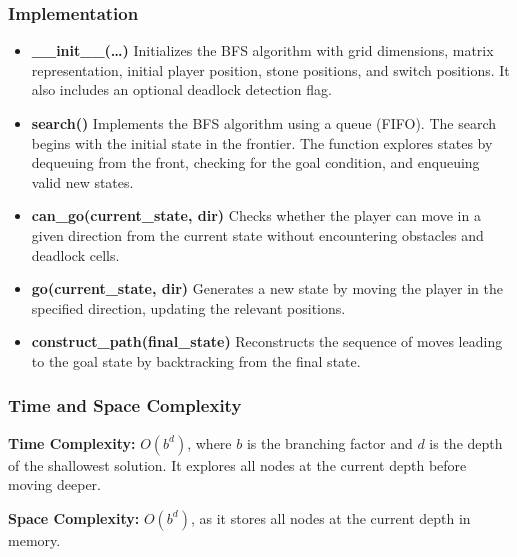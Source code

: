 \subsubsection{Implementation}
\begin{itemize}
	\item \textbf{\_\_init\_\_(\ldots)}
	      Initializes the BFS algorithm with grid dimensions, matrix representation, initial player position, stone positions, and switch positions. It also includes an optional deadlock detection flag.

	\item \textbf{search()}
	      Implements the BFS algorithm using a queue (FIFO). The search begins with the initial state in the frontier. The function explores states by dequeuing from the front, checking for the goal condition, and enqueuing valid new states.

	\item \textbf{can\_go(current\_state, dir)}
	      Checks whether the player can move in a given direction from the current state without encountering obstacles and deadlock cells.

	\item \textbf{go(current\_state, dir)}
	      Generates a new state by moving the player in the specified direction, updating the relevant positions.

	\item \textbf{construct\_path(final\_state)}
	      Reconstructs the sequence of moves leading to the goal state by backtracking from the final state.

\end{itemize}


\subsubsection{Time and Space Complexity}
\textbf{Time Complexity:} \( O(b^d) \), where \( b \) is the branching factor and \( d \) is the depth of the shallowest solution. It explores all nodes at the current depth before moving deeper.

\textbf{Space Complexity:} \( O(b^d) \), as it stores all nodes at the current depth in memory.
